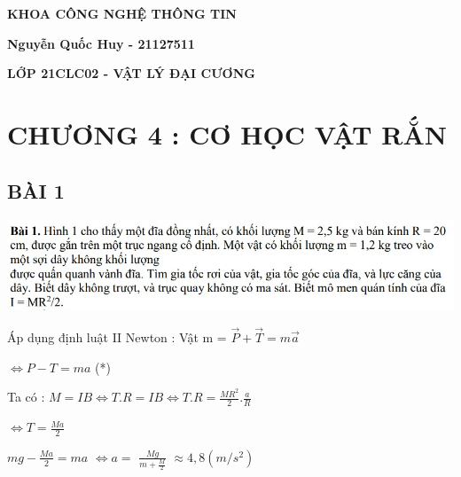 \documentclass[12pt,a4paper]{article}
\begin{document}
\thispagestyle{empty}
\begin{LARGE}
    \begin{center}{\underline{\color{red}{\bf NATIONAL UNIVERSITY OF HO CHI MINH CITY}}}
    \end{center}
\end{LARGE}
\vspace*{1cm}
\begin{center}{\Huge \color{green}\textbf{KHOA CÔNG NGHỆ THÔNG TIN}}
\end{center}
\vspace*{15cm}
\begin{center}{\Huge \color{cyan}\textbf{Nguyễn Quốc Huy - 21127511}}
\end{center}
\vspace*{1cm}
\begin{center}
    {\Huge \color{cyan}\textbf{{LỚP 21CLC02 - VẬT LÝ ĐẠI CƯƠNG}}}
\end{center}
\newpage
\let\cleardoublepage\clearpage

\tableofcontents

\newpage
\section{\textbf{\color{red}CHƯƠNG 4 : CƠ HỌC VẬT RẮN}}
\Large \subsection{\color{blue}\textbf{BÀI 1} }
\includegraphics[scale=0.80]{N04_1.jpg}

\vspace*{1cm}
Áp dụng định luật II Newton :  Vật m = $ \vec{P} + \vec{T} = m\vec{a}$

\vspace*{1cm}
$\Leftrightarrow P - T = ma$ (*)

\vspace*{1cm}
Ta có : $ M = IB \Leftrightarrow T.R = IB \Leftrightarrow T.R = \frac{MR^2}{2} . \frac{a}{R}$

\vspace*{1cm}
$\Leftrightarrow T = \frac{Ma}{2}$

\vspace*{1cm}
$ mg - \frac{Ma}{2} = ma$
$\Leftrightarrow a = $ 
$\frac{Mg}{m + \frac{M}{2}} $
$\approx 4,8 (m/s^2)$
\end{document}
